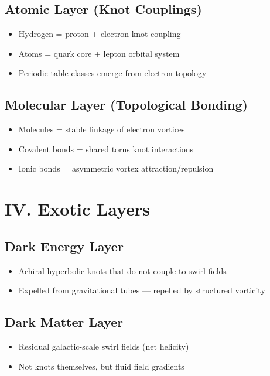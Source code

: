 \documentclass[12pt]{article}
\begin{document}
\subsection*{Atomic Layer (Knot Couplings)}
\begin{itemize}
    \item Hydrogen = proton + electron knot coupling
    \item Atoms = quark core + lepton orbital system
    \item Periodic table classes emerge from electron topology
\end{itemize}

\subsection*{Molecular Layer (Topological Bonding)}
\begin{itemize}
    \item Molecules = stable linkage of electron vortices
    \item Covalent bonds = shared torus knot interactions
    \item Ionic bonds = asymmetric vortex attraction/repulsion
\end{itemize}

\section*{IV. Exotic Layers}

\subsection*{Dark Energy Layer}
\begin{itemize}
    \item Achiral hyperbolic knots that do not couple to swirl fields
    \item Expelled from gravitational tubes — repelled by structured vorticity
\end{itemize}

\subsection*{Dark Matter Layer}
\begin{itemize}
    \item Residual galactic-scale swirl fields (net helicity)
    \item Not knots themselves, but fluid field gradients
\end{itemize}
\end{document}
